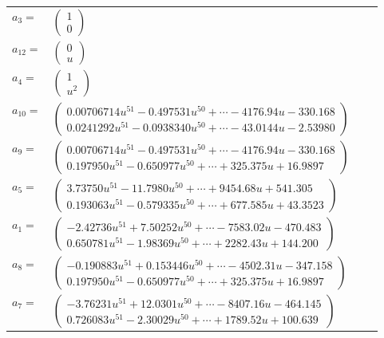 \documentclass[1p]{elsarticle_modified}
\theoremstyle{definition}
\begin{document}
\begin{tabular}{m{7pt} m{180pt} m{7pt} m{180pt} }
\flushright $a_{3}=$&$\begin{pmatrix}1\\0\end{pmatrix}$ \\
\flushright $a_{12}=$&$\begin{pmatrix}0\\u\end{pmatrix}$ \\
\flushright $a_{4}=$&$\begin{pmatrix}1\\u^2\end{pmatrix}$ \\
\flushright $a_{10}=$&$\begin{pmatrix}0.00706714 u^{51}-0.497531 u^{50}+\cdots-4176.94 u-330.168\\0.0241292 u^{51}-0.0938340 u^{50}+\cdots-43.0144 u-2.53980\end{pmatrix}$ \\
\flushright $a_{9}=$&$\begin{pmatrix}0.00706714 u^{51}-0.497531 u^{50}+\cdots-4176.94 u-330.168\\0.197950 u^{51}-0.650977 u^{50}+\cdots+325.375 u+16.9897\end{pmatrix}$ \\
\flushright $a_{5}=$&$\begin{pmatrix}3.73750 u^{51}-11.7980 u^{50}+\cdots+9454.68 u+541.305\\0.193063 u^{51}-0.579335 u^{50}+\cdots+677.585 u+43.3523\end{pmatrix}$ \\
\flushright $a_{1}=$&$\begin{pmatrix}-2.42736 u^{51}+7.50252 u^{50}+\cdots-7583.02 u-470.483\\0.650781 u^{51}-1.98369 u^{50}+\cdots+2282.43 u+144.200\end{pmatrix}$ \\
\flushright $a_{8}=$&$\begin{pmatrix}-0.190883 u^{51}+0.153446 u^{50}+\cdots-4502.31 u-347.158\\0.197950 u^{51}-0.650977 u^{50}+\cdots+325.375 u+16.9897\end{pmatrix}$ \\
\flushright $a_{7}=$&$\begin{pmatrix}-3.76231 u^{51}+12.0301 u^{50}+\cdots-8407.16 u-464.145\\0.726083 u^{51}-2.30029 u^{50}+\cdots+1789.52 u+100.639\end{pmatrix}$ \\

\end{tabular}
\end{document}

